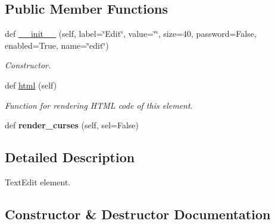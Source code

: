 \subsection*{Public Member Functions}
\begin{DoxyCompactItemize}
\item 
def \hyperlink{classwax_1_1Components_1_1WTextEdit_a447086ab6d370b7b345ee5d7d9d1ef45}{\+\_\+\+\_\+init\+\_\+\+\_\+} (self, label=\char`\"{}Edit\char`\"{}, value=\char`\"{}\char`\"{}, size=40, password=False, enabled=True, name=\char`\"{}edit\char`\"{})
\begin{DoxyCompactList}\small\item\em Constructor. \end{DoxyCompactList}\item 
def \hyperlink{classwax_1_1Components_1_1WTextEdit_a38ad3f43e8d97547f250930be64603f6}{html} (self)
\begin{DoxyCompactList}\small\item\em Function for rendering H\+T\+ML code of this element. \end{DoxyCompactList}\item 
def {\bfseries render\+\_\+curses} (self, sel=False)\hypertarget{classwax_1_1Components_1_1WTextEdit_a70d9ca04df9a601a1e4cc8ac83beed85}{}\label{classwax_1_1Components_1_1WTextEdit_a70d9ca04df9a601a1e4cc8ac83beed85}

\end{DoxyCompactItemize}


\subsection{Detailed Description}
Text\+Edit element. 

\subsection{Constructor \& Destructor Documentation}
